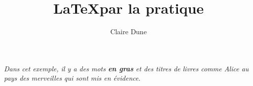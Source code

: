 \documentclass[10pt,a4paper]{article}
\author{Claire Dune}
\title{\LaTeX par la pratique}
\begin{document}
\emph{Dans cet exemple, il y a des mots \textbf{en gras} et des
titres de livres comme \emph{Alice au pays des merveilles} qui sont
mis en évidence}.
\end{document}
